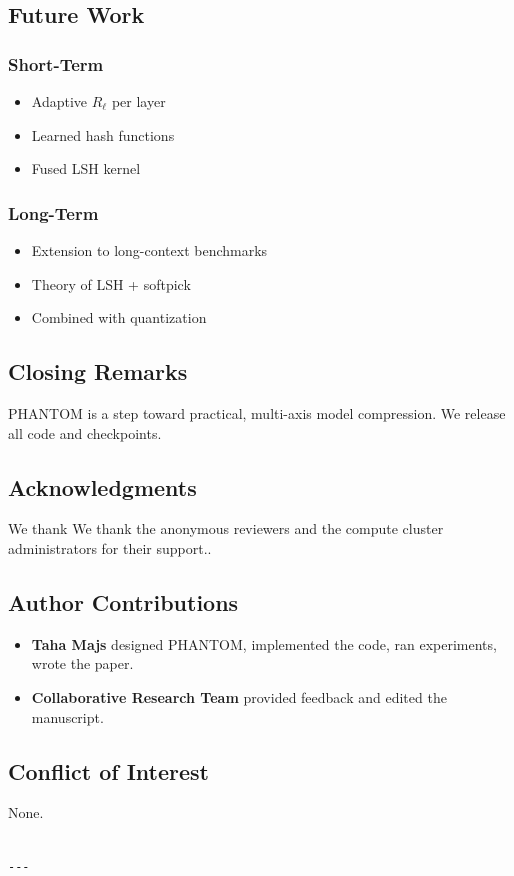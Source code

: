 \subsection{Future Work}

\subsubsection{Short-Term}
\begin{itemize}
\item Adaptive $R_\ell$ per layer
\item Learned hash functions
\item Fused LSH kernel

\end{itemize}
\subsubsection{Long-Term}
\begin{itemize}
\item Extension to long-context benchmarks
\item Theory of LSH + softpick
\item Combined with quantization

\end{itemize}
\subsection{Closing Remarks}

PHANTOM is a step toward practical, multi-axis model compression. We release 
all code and checkpoints.

\subsection{Acknowledgments}

We thank We thank the anonymous reviewers and the compute cluster administrators for their support..

\subsection{Author Contributions}

\begin{itemize}
\item \textbf{Taha Majs} designed PHANTOM, implemented the code, ran experiments,
  wrote the paper.
\item \textbf{Collaborative Research Team} provided feedback and edited the manuscript.

\end{itemize}
\subsection{Conflict of Interest}

None.
\begin{lstlisting}

---
\end{lstlisting}